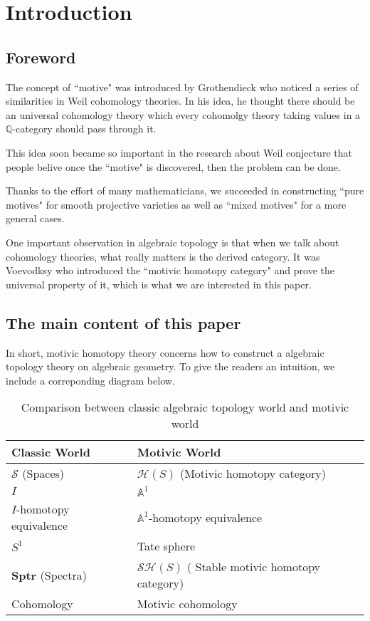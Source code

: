 
\chapter{Introduction}
\section{Foreword}

The concept of ``motive" was introduced by Grothendieck who noticed a series of similarities in Weil cohomology theories. In his idea, he thought there should be an universal cohomology theory which every cohomolgy theory taking values in a $\mathbb{Q}$-category should pass through it.

This idea soon became so important in the research about Weil conjecture that people belive once the ``motive" is discovered, then the problem can be done.

Thanks to the effort of many mathematicians, we succeeded in constructing ``pure motives" for smooth projective varieties as well as ``mixed motives" for a more general cases.

One important observation in algebraic topology is that when we talk about cohomology theories, what really matters is the derived category. It was Voevodksy who introduced the ``motivic homotopy category" and prove the universal property of it, which is what we are interested in this paper.

\section{The main content of this paper}
In short, motivic homotopy theory concerns how to construct a algebraic topology theory on algebraic geometry. To give the readers an intuition, we include a correponding diagram below.

\begin{table}[ht]
\centering
\caption{Comparison between classic algebraic topology world and motivic world}
\begin{tabular}{|>{\centering\arraybackslash}m{4cm}|>{\centering\arraybackslash}m{4cm}|}
\hline
\textbf{Classic World} & \textbf{Motivic World} \\
\hline
$\mathscr{S}$ (Spaces) & $\mathcal{H}(S)$ (Motivic homotopy category) \\
\hline
$I$& $\mathbb{A}^1$ \\
\hline
$I$-homotopy equivalence & $\mathbb{A}^1$-homotopy equivalence \\
\hline
$S^1$& Tate sphere \\
\hline
$\textbf{Sptr}$ (Spectra) & $\mathcal{SH}(S)$ ( Stable motivic homotopy category) \\
\hline
Cohomology & Motivic cohomology \\
\hline
\end{tabular}
\end{table}

